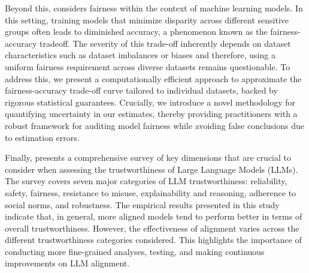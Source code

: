 Beyond this, \cite{taufiq2024achievablefairnessdatautility} considers fairness within the context of machine learning models. 
In this setting, training models that minimize disparity across different sensitive groups often leads to diminished accuracy, a phenomenon known as the fairness-accuracy tradeoff. 
The severity of this trade-off inherently depends on dataset characteristics such as dataset
imbalances or biases and therefore, using a uniform fairness requirement across diverse datasets
remains questionable. To address this, we present a computationally efficient approach to approximate the fairness-accuracy trade-off curve tailored to individual datasets, backed by rigorous
statistical guarantees.  Crucially, we introduce a novel methodology for quantifying uncertainty in our
estimates, thereby providing practitioners with a robust framework for auditing model fairness
while avoiding false conclusions due to estimation errors.

Finally, \cite{liu2024trustworthyllmssurveyguideline} presents a comprehensive survey of key dimensions that are crucial to consider when assessing the trustworthiness of Large Language Models (LLMs). 
The survey covers seven major categories of LLM trustworthiness: reliability, safety, fairness, resistance to misuse, explainability and reasoning, adherence to social norms, and robustness. 
The empirical results presented in this study indicate that, in general, more aligned models tend to perform better in terms of overall trustworthiness. However, the effectiveness of alignment varies across the different trustworthiness categories considered. This highlights the importance of conducting more fine-grained analyses, testing, and making continuous improvements on LLM alignment. 
